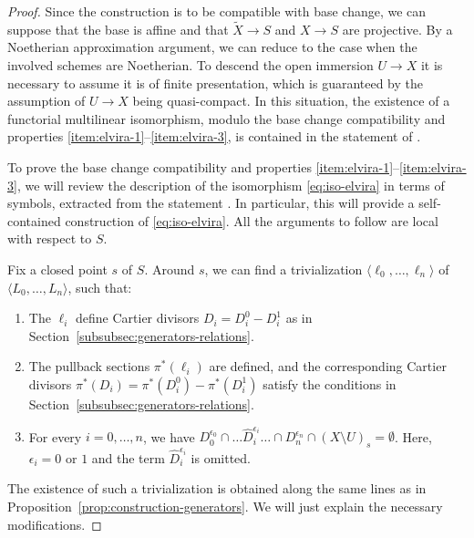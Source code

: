 \begin{proof}
Since the construction is to be compatible with base change, we can suppose that the base is affine and that $\widetilde{X} \to S$ and $X\to S$ are projective. By a Noetherian approximation argument, we can reduce to the case when the involved schemes are Noetherian. To descend the open immersion $U \to X$ it is necessary to assume it is of finite presentation, which is guaranteed by the assumption of $U \to X$ being quasi-compact. In this situation, the existence of a functorial multilinear isomorphism, modulo the base change compatibility and properties \eqref{item:elvira-1}--\eqref{item:elvira-3}, is contained in the statement of \cite[Th.\,5.3.1]{Munoz}.

To prove the base change compatibility and properties \eqref{item:elvira-1}--\eqref{item:elvira-3}, we will review the description of the isomorphism \eqref{eq:iso-elvira} in terms of symbols, extracted from the statement \cite[Th.\,5.3.1]{Munoz}. In particular, this will provide a self-contained construction of \eqref{eq:iso-elvira}. All the arguments to follow are local with respect to $S$.

Fix a closed point $s$ of $S$. Around $s$, we can find a trivialization $\langle\ell_{0},\ldots,\ell_{n}\rangle$ of $\langle L_{0},\ldots, L_{n}\rangle$, such that:
\begin{enumerate}
\item[(a)] The $\ell_{i}$ define Cartier divisors $D_{i}=D_{i}^{0}-D_{i}^{1}$ as in Section~\ref{subsubsec:generators-relations}.
\item[(b)] The pullback sections $\pi^{\ast}(\ell_{i})$ are defined, and the corresponding Cartier divisors $\pi^{\ast}(D_{i})=\pi^{\ast}(D_{i}^{0})-\pi^{\ast}(D_{i}^{1})$ satisfy the conditions in Section~\ref{subsubsec:generators-relations}.
\item[(c)] For every $i=0,\ldots, n$, we have $D_{0}^{\epsilon_{0}}\cap\ldots\widehat{D}_{i}^{\epsilon_{i}}\ldots\cap D_{n}^{\epsilon_{n}}\cap (X\setminus U)_{s}=\emptyset$. Here, $\epsilon_{i}=0$ or $1$ and the term $\widehat{D}_{i}^{\epsilon_{i}}$ is omitted.
\end{enumerate}
The existence of such a trivialization is obtained along the same lines as in Proposition~\ref{prop:construction-generators}. We will just explain the necessary modifications.


\end{proof}
